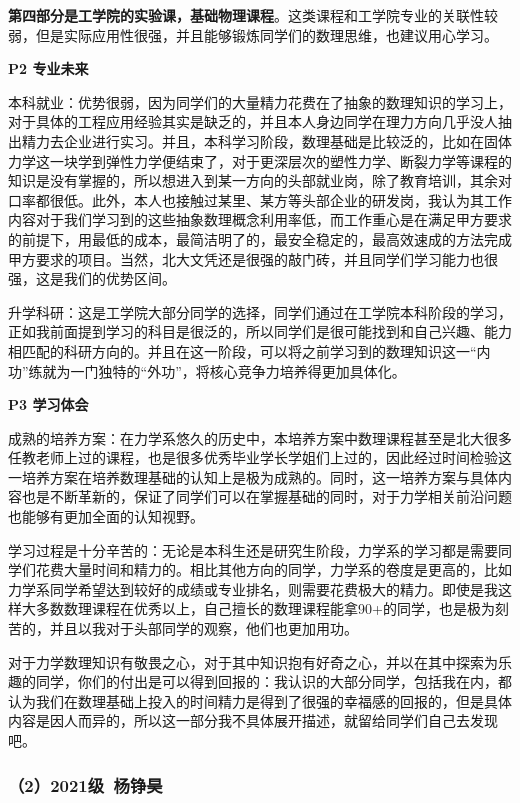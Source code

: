 \documentclass[11pt,oneside]{book}
\begin{document}
\textbf{第四部分是工学院的实验课，基础物理课程}。这类课程和工学院专业的关联性较弱，但是实际应用性很强，并且能够锻炼同学们的数理思维，也建议用心学习。

\textbf{P2 专业未来}

本科就业：优势很弱，因为同学们的大量精力花费在了抽象的数理知识的学习上，对于具体的工程应用经验其实是缺乏的，并且本人身边同学在理力方向几乎没人抽出精力去企业进行实习。并且，本科学习阶段，数理基础是比较泛的，比如在固体力学这一块学到弹性力学便结束了，对于更深层次的塑性力学、断裂力学等课程的知识是没有掌握的，所以想进入到某一方向的头部就业岗，除了教育培训，其余对口率都很低。此外，本人也接触过某里、某方等头部企业的研发岗，我认为其工作内容对于我们学习到的这些抽象数理概念利用率低，而工作重心是在满足甲方要求的前提下，用最低的成本，最简洁明了的，最安全稳定的，最高效速成的方法完成甲方要求的项目。当然，北大文凭还是很强的敲门砖，并且同学们学习能力也很强，这是我们的优势区间。

升学科研：这是工学院大部分同学的选择，同学们通过在工学院本科阶段的学习，正如我前面提到学习的科目是很泛的，所以同学们是很可能找到和自己兴趣、能力相匹配的科研方向的。并且在这一阶段，可以将之前学习到的数理知识这一“内功”练就为一门独特的“外功”，将核心竞争力培养得更加具体化。
 
\textbf{P3 学习体会}

成熟的培养方案：在力学系悠久的历史中，本培养方案中数理课程甚至是北大很多任教老师上过的课程，也是很多优秀毕业学长学姐们上过的，因此经过时间检验这一培养方案在培养数理基础的认知上是极为成熟的。同时，这一培养方案与具体内容也是不断革新的，保证了同学们可以在掌握基础的同时，对于力学相关前沿问题也能够有更加全面的认知视野。

学习过程是十分辛苦的：无论是本科生还是研究生阶段，力学系的学习都是需要同学们花费大量时间和精力的。相比其他方向的同学，力学系的卷度是更高的，比如力学系同学希望达到较好的成绩或专业排名，则需要花费极大的精力。即使是我这样大多数数理课程在优秀以上，自己擅长的数理课程能拿90+的同学，也是极为刻苦的，并且以我对于头部同学的观察，他们也更加用功。

对于力学数理知识有敬畏之心，对于其中知识抱有好奇之心，并以在其中探索为乐趣的同学，你们的付出是可以得到回报的：我认识的大部分同学，包括我在内，都认为我们在数理基础上投入的时间精力是得到了很强的幸福感的回报的，但是具体内容是因人而异的，所以这一部分我不具体展开描述，就留给同学们自己去发现吧。

\subsubsection{（2）2021级\ 杨铮昊}
\end{document}
